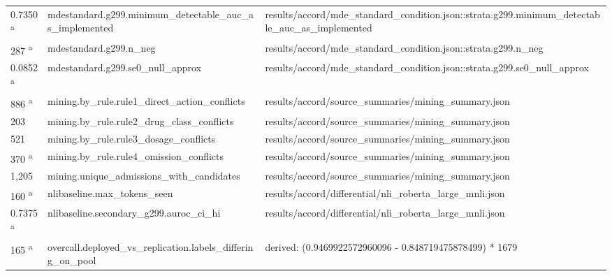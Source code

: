 \begin{longtable}{@{}p{0.7in}p{1.9in}p{2.6in}@{}}
0.7350 \textsuperscript{a} & mdestandard.\allowbreak{}g299.\allowbreak{}minimum\_detectable\_auc\_as\_implemented & results/\allowbreak{}accord/\allowbreak{}mde\_standard\_condition.\allowbreak{}json::strata.\allowbreak{}g299.\allowbreak{}minimum\_detectable\_auc\_as\_implemented\\
287 \textsuperscript{a} & mdestandard.\allowbreak{}g299.\allowbreak{}n\_neg & results/\allowbreak{}accord/\allowbreak{}mde\_standard\_condition.\allowbreak{}json::strata.\allowbreak{}g299.\allowbreak{}n\_neg\\
0.0852 \textsuperscript{a} & mdestandard.\allowbreak{}g299.\allowbreak{}se0\_null\_approx & results/\allowbreak{}accord/\allowbreak{}mde\_standard\_condition.\allowbreak{}json::strata.\allowbreak{}g299.\allowbreak{}se0\_null\_approx\\
886 \textsuperscript{a} & mining.\allowbreak{}by\_rule.\allowbreak{}rule1\_direct\_action\_conflicts & results/\allowbreak{}accord/\allowbreak{}source\_summaries/\allowbreak{}mining\_summary.\allowbreak{}json\\
203 & mining.\allowbreak{}by\_rule.\allowbreak{}rule2\_drug\_class\_conflicts & results/\allowbreak{}accord/\allowbreak{}source\_summaries/\allowbreak{}mining\_summary.\allowbreak{}json\\
521 & mining.\allowbreak{}by\_rule.\allowbreak{}rule3\_dosage\_conflicts & results/\allowbreak{}accord/\allowbreak{}source\_summaries/\allowbreak{}mining\_summary.\allowbreak{}json\\
370 \textsuperscript{a} & mining.\allowbreak{}by\_rule.\allowbreak{}rule4\_omission\_conflicts & results/\allowbreak{}accord/\allowbreak{}source\_summaries/\allowbreak{}mining\_summary.\allowbreak{}json\\
1,205 & mining.\allowbreak{}unique\_admissions\_with\_candidates & results/\allowbreak{}accord/\allowbreak{}source\_summaries/\allowbreak{}mining\_summary.\allowbreak{}json\\
160 \textsuperscript{a} & nlibaseline.\allowbreak{}max\_tokens\_seen & results/\allowbreak{}accord/\allowbreak{}differential/\allowbreak{}nli\_roberta\_large\_mnli.\allowbreak{}json\\
0.7375 \textsuperscript{a} & nlibaseline.\allowbreak{}secondary\_g299.\allowbreak{}auroc\_ci\_hi & results/\allowbreak{}accord/\allowbreak{}differential/\allowbreak{}nli\_roberta\_large\_mnli.\allowbreak{}json\\
165 \textsuperscript{a} & overcall.\allowbreak{}deployed\_vs\_replication.\allowbreak{}labels\_differing\_on\_pool & derived: (0.\allowbreak{}9469922572960096 - 0.\allowbreak{}848719475878499) * 1679\\

\end{longtable}
